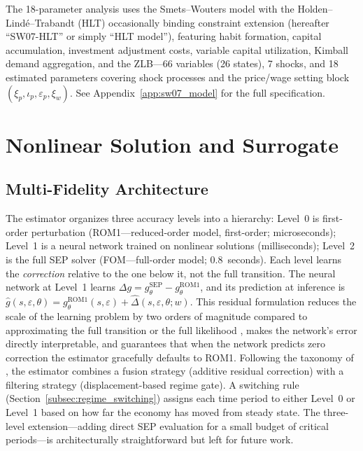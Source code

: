\documentclass[12pt]{article}
\theoremstyle{plain}
\theoremstyle{definition}
\theoremstyle{remark}
\begin{document}
The 18-parameter analysis uses the Smets--Wouters model with the Holden--Lind\'e--Trabandt (HLT) occasionally binding constraint extension (hereafter ``SW07-HLT'' or simply ``HLT model''), featuring habit formation, capital accumulation, investment adjustment costs, variable capital utilization, Kimball demand aggregation, and the ZLB---66 variables (26 states), 7 shocks, and 18 estimated parameters covering shock processes and the price/wage setting block $(\xi_p, \iota_p, \varepsilon_p, \xi_w)$. See Appendix~\ref{app:sw07_model} for the full specification.



\section{Nonlinear Solution and Surrogate}
\label{sec:methodology}

\subsection{Multi-Fidelity Architecture}
\label{subsec:multifidelity}

The estimator organizes three accuracy levels into a hierarchy: Level~0 is first-order perturbation (ROM1---reduced-order model, first-order; microseconds); Level~1 is a neural network trained on nonlinear solutions (milliseconds); Level~2 is the full SEP solver (FOM---full-order model; 0.8~seconds). Each level learns the \textit{correction} relative to the one below it, not the full transition. The neural network at Level~1 learns $\Delta g = g_\theta^{\text{SEP}} - g_\theta^{\text{ROM1}}$, and its prediction at inference is $\hat{g}(s,\varepsilon,\theta) = g_\theta^{\text{ROM1}}(s,\varepsilon) + \hat{\Delta}(s,\varepsilon,\theta; w)$. This residual formulation reduces the scale of the learning problem by two orders of magnitude compared to approximating the full transition or the full likelihood \citep[as in][]{kase2025estimating}, makes the network's error directly interpretable, and guarantees that when the network predicts zero correction the estimator gracefully defaults to ROM1. Following the taxonomy of \citet{peherstorfer2018survey}, the estimator combines a fusion strategy (additive residual correction) with a filtering strategy (displacement-based regime gate). A switching rule (Section~\ref{subsec:regime_switching}) assigns each time period to either Level~0 or Level~1 based on how far the economy has moved from steady state. The three-level extension---adding direct SEP evaluation for a small budget of critical periods---is architecturally straightforward but left for future work.
\end{document}
